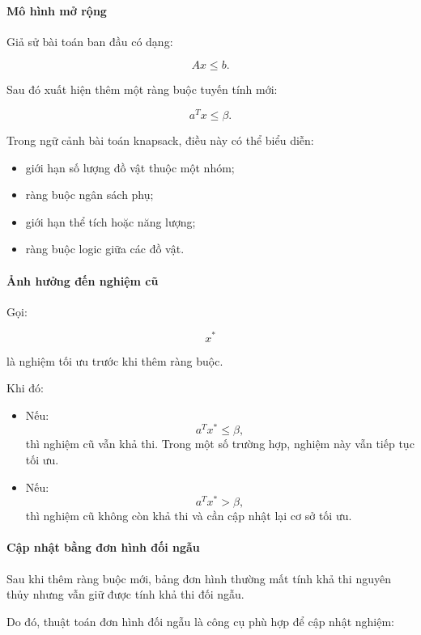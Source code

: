 \documentclass[fontsize=13pt,a4paper]{report}
\begin{document}
\paragraph{Mô hình mở rộng}

Giả sử bài toán ban đầu có dạng:

\[
Ax \le b.
\]

Sau đó xuất hiện thêm một ràng buộc tuyến tính mới:

\[
a^{T}x \le \beta.
\]

Trong ngữ cảnh bài toán knapsack, điều này có thể biểu diễn:

\begin{itemize}
    \item giới hạn số lượng đồ vật thuộc một nhóm;
    \item ràng buộc ngân sách phụ;
    \item giới hạn thể tích hoặc năng lượng;
    \item ràng buộc logic giữa các đồ vật.
\end{itemize}

\paragraph{Ảnh hưởng đến nghiệm cũ}

Gọi:

\[
x^*
\]

là nghiệm tối ưu trước khi thêm ràng buộc.

Khi đó:

\begin{itemize}

    \item Nếu:
    \[
    a^Tx^* \le \beta,
    \]
    thì nghiệm cũ vẫn khả thi. Trong một số trường hợp, nghiệm này vẫn tiếp tục tối ưu.

    \item Nếu:
    \[
    a^Tx^* > \beta,
    \]
    thì nghiệm cũ không còn khả thi và cần cập nhật lại cơ sở tối ưu.

\end{itemize}

\paragraph{Cập nhật bằng đơn hình đối ngẫu}

Sau khi thêm ràng buộc mới, bảng đơn hình thường mất tính khả thi nguyên thủy nhưng vẫn giữ được tính khả thi đối ngẫu.

Do đó, thuật toán đơn hình đối ngẫu là công cụ phù hợp để cập nhật nghiệm:
\end{document}
